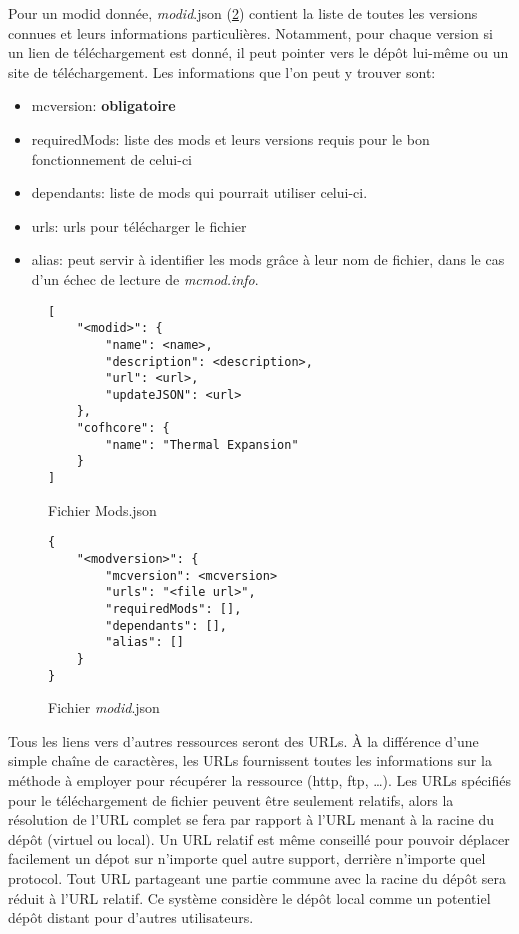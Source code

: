 \documentclass{article}
\begin{document}
Pour un modid donnée, \textit{modid}.json (\ref{figure:modid.json}) contient la liste de toutes les versions connues et leurs informations particulières.
Notamment, pour chaque version si un lien de téléchargement est donné, il peut pointer vers le dépôt lui-même ou un site de téléchargement.
Les informations que l'on peut y trouver sont:
\begin{itemize}
    \item mcversion: \textbf{obligatoire}
    \item requiredMods: liste des mods et leurs versions requis pour le bon fonctionnement de celui-ci
    \item dependants: liste de mods qui pourrait utiliser celui-ci.
    \item urls: urls pour télécharger le fichier
    \item alias: peut servir à identifier les mods grâce à leur nom de fichier, dans le cas d'un échec de lecture de \textit{mcmod.info}.
\end{itemize}

\begin{figure}
\centering
\begin{verbatim}
[
    "<modid>": {
        "name": <name>,
        "description": <description>,
        "url": <url>,
        "updateJSON": <url>
    },
    "cofhcore": {
        "name": "Thermal Expansion"
    }
]
\end{verbatim}
\caption{Fichier Mods.json}
\label{figure:mods.json}
\end{figure}

\begin{figure}
\begin{verbatim}
{
    "<modversion>": {
        "mcversion": <mcversion>
        "urls": "<file url>",
        "requiredMods": [],
        "dependants": [],
        "alias": []
    }
}
\end{verbatim}
\caption{Fichier \textit{modid}.json}
\label{figure:modid.json}
\end{figure}


Tous les liens vers d'autres ressources seront des URLs.
À la différence d'une simple chaîne de caractères, les URLs fournissent toutes les informations sur la méthode à employer pour récupérer la ressource (http, ftp, \dots).
Les URLs spécifiés pour le téléchargement de fichier peuvent être seulement relatifs, alors la résolution de l'URL complet se fera par rapport à l'URL menant à la racine du dépôt (virtuel ou local).
Un URL relatif est même conseillé pour pouvoir déplacer facilement un dépot sur n'importe quel autre support, derrière n'importe quel protocol.
Tout URL partageant une partie commune avec la racine du dépôt sera réduit à l'URL relatif.
Ce système considère le dépôt local comme un potentiel dépôt distant pour d'autres utilisateurs.
\end{document}
